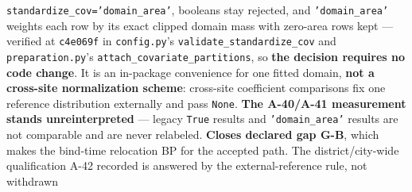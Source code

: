 \documentclass[
  10pt,
]{article}
\begin{document}
\begin{landscape}
\begin{longtable}[]
\texttt{standardize\_cov='domain\_area'}, booleans stay rejected, and \texttt{'domain\_area'} weights each row by its exact clipped domain mass with zero-area rows kept --- verified at \texttt{c4e069f} in \texttt{config.py}'s \texttt{validate\_standardize\_cov} and \texttt{preparation.py}'s \texttt{attach\_covariate\_partitions}, so \textbf{the decision requires no code change}. It is an in-package convenience for one fitted domain, \textbf{not a cross-site normalization scheme}: cross-site coefficient comparisons fix one reference distribution externally and pass \texttt{None}. \textbf{The A-40/A-41 measurement stands unreinterpreted} --- legacy \texttt{True} results and \texttt{'domain\_area'} results are not comparable and are never relabeled. \textbf{Closes declared gap G-B}, which makes the bind-time relocation BP for the accepted path. The district/city-wide qualification A-42 recorded is answered by the external-reference rule, not withdrawn \\

\end{longtable}
\end{landscape}
\end{document}
